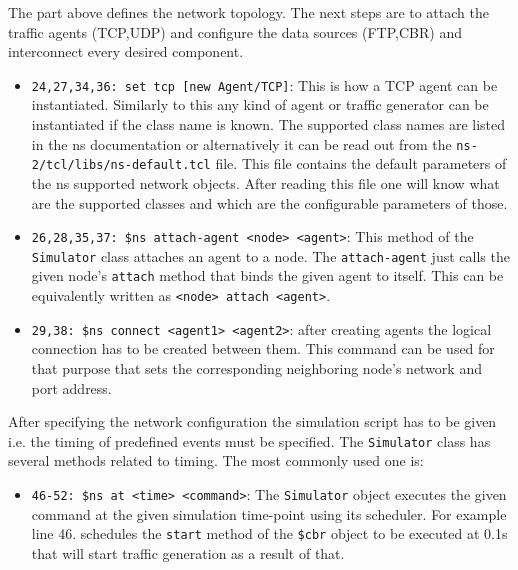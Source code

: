 \documentclass[a4paper]{article}
\begin{document}
The part above defines the network topology. The next steps are to attach the traffic agents (TCP,UDP) and configure the data sources (FTP,CBR) and interconnect every desired component.

\begin{itemize}%

\item \verb!24,27,34,36: set tcp [new Agent/TCP]!: This is how a TCP agent can be instantiated. Similarly to this any kind of agent or traffic generator can be instantiated if the class name is known. The supported class names are listed in the ns documentation or alternatively it can be read out from the \verb!ns-2/tcl/libs/ns-default.tcl! file. This file contains the default parameters of the ns supported network objects. After reading this file one will know what are the supported classes and which are the configurable parameters of those.

\item \verb!26,28,35,37: $ns attach-agent <node> <agent>!: This method of the \verb!Simulator! class attaches an agent to a node. The \verb!attach-agent! just calls the given node's \verb!attach! method that binds the given agent to itself. This can be equivalently written as \verb!<node> attach <agent>!.

\item \verb!29,38: $ns connect <agent1> <agent2>!: after creating agents the logical connection has to be created between them. This command can be used for that purpose that sets the corresponding neighboring node's network and port address.

\end{itemize}

After specifying the network configuration the simulation script has to be given i.e. the timing of predefined events must be specified. The \verb!Simulator! class has several methods related to timing. The most commonly used one is:

\begin{itemize}

\item \verb!46-52: $ns at <time> <command>!: The \verb!Simulator! object executes the given command at the given simulation time-point  using its scheduler. For example line 46. schedules the \verb!start! method of the \verb!$cbr! object to be executed at 0.1s that will start traffic generation as a result of that.

\end{itemize}
\end{document}

